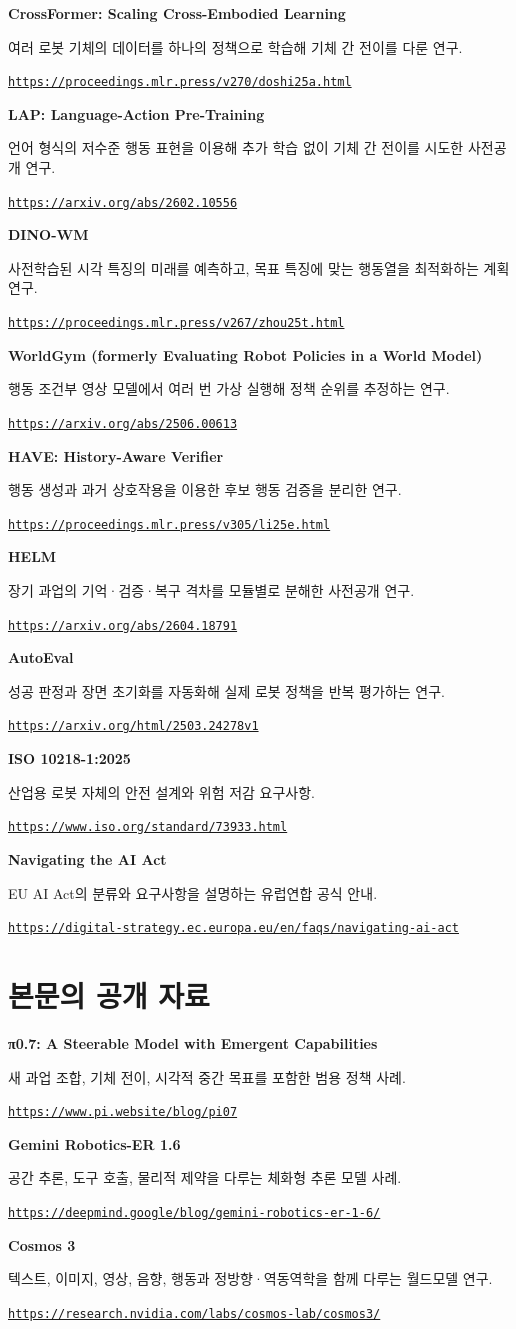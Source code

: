 \documentclass[11pt,openany]{book}
\newcommand{\sourceitem}[3]{%
  \par\smallskip\noindent
  {\sffamily\bfseries\color{deepblue}#1}\par
  {\footnotesize #2\par\href{#3}{\nolinkurl{#3}}}\par
}
\begin{document}
\sourceitem{CrossFormer: Scaling Cross-Embodied Learning}
{여러 로봇 기체의 데이터를 하나의 정책으로 학습해 기체 간 전이를 다룬 연구.}
{https://proceedings.mlr.press/v270/doshi25a.html}

\sourceitem{LAP: Language-Action Pre-Training}
{언어 형식의 저수준 행동 표현을 이용해 추가 학습 없이 기체 간 전이를 시도한 사전공개 연구.}
{https://arxiv.org/abs/2602.10556}

\sourceitem{DINO-WM}
{사전학습된 시각 특징의 미래를 예측하고, 목표 특징에 맞는 행동열을 최적화하는 계획 연구.}
{https://proceedings.mlr.press/v267/zhou25t.html}

\sourceitem{WorldGym (formerly Evaluating Robot Policies in a World Model)}
{행동 조건부 영상 모델에서 여러 번 가상 실행해 정책 순위를 추정하는 연구.}
{https://arxiv.org/abs/2506.00613}

\sourceitem{HAVE: History-Aware Verifier}
{행동 생성과 과거 상호작용을 이용한 후보 행동 검증을 분리한 연구.}
{https://proceedings.mlr.press/v305/li25e.html}

\sourceitem{HELM}
{장기 과업의 기억·검증·복구 격차를 모듈별로 분해한 사전공개 연구.}
{https://arxiv.org/abs/2604.18791}

\sourceitem{AutoEval}
{성공 판정과 장면 초기화를 자동화해 실제 로봇 정책을 반복 평가하는 연구.}
{https://arxiv.org/html/2503.24278v1}

\sourceitem{ISO 10218-1:2025}
{산업용 로봇 자체의 안전 설계와 위험 저감 요구사항.}
{https://www.iso.org/standard/73933.html}

\sourceitem{Navigating the AI Act}
{EU AI Act의 분류와 요구사항을 설명하는 유럽연합 공식 안내.}
{https://digital-strategy.ec.europa.eu/en/faqs/navigating-ai-act}

\section*{본문의 공개 자료}

\sourceitem{π0.7: A Steerable Model with Emergent Capabilities}
{새 과업 조합, 기체 전이, 시각적 중간 목표를 포함한 범용 정책 사례.}
{https://www.pi.website/blog/pi07}

\sourceitem{Gemini Robotics-ER 1.6}
{공간 추론, 도구 호출, 물리적 제약을 다루는 체화형 추론 모델 사례.}
{https://deepmind.google/blog/gemini-robotics-er-1-6/}

\sourceitem{Cosmos 3}
{텍스트, 이미지, 영상, 음향, 행동과 정방향·역동역학을 함께 다루는 월드모델 연구.}
{https://research.nvidia.com/labs/cosmos-lab/cosmos3/}
\end{document}

